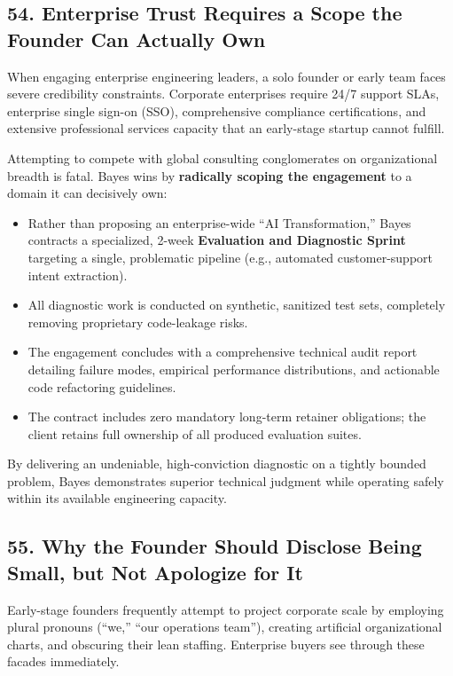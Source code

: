 \subsection*{54. Enterprise Trust Requires a Scope the Founder Can Actually Own}

When engaging enterprise engineering leaders, a solo founder or early team faces severe credibility constraints. Corporate enterprises require 24/7 support SLAs, enterprise single sign-on (SSO), comprehensive compliance certifications, and extensive professional services capacity that an early-stage startup cannot fulfill.

Attempting to compete with global consulting conglomerates on organizational breadth is fatal. Bayes wins by \textbf{radically scoping the engagement} to a domain it can decisively own:
\begin{itemize}
\item Rather than proposing an enterprise-wide ``AI Transformation,'' Bayes contracts a specialized, 2-week \textbf{Evaluation and Diagnostic Sprint} targeting a single, problematic pipeline (e.g., automated customer-support intent extraction).
\item All diagnostic work is conducted on synthetic, sanitized test sets, completely removing proprietary code-leakage risks.
\item The engagement concludes with a comprehensive technical audit report detailing failure modes, empirical performance distributions, and actionable code refactoring guidelines.
\item The contract includes zero mandatory long-term retainer obligations; the client retains full ownership of all produced evaluation suites.
\end{itemize}

By delivering an undeniable, high-conviction diagnostic on a tightly bounded problem, Bayes demonstrates superior technical judgment while operating safely within its available engineering capacity.

\subsection*{55. Why the Founder Should Disclose Being Small, but Not Apologize for It}

Early-stage founders frequently attempt to project corporate scale by employing plural pronouns (``we,'' ``our operations team''), creating artificial organizational charts, and obscuring their lean staffing. Enterprise buyers see through these facades immediately.

